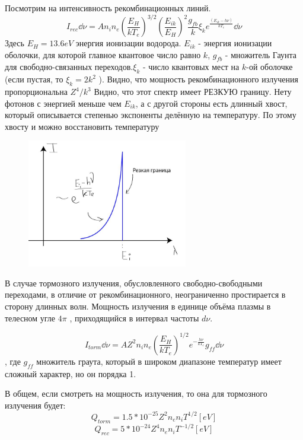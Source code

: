 \documentclass[10pt, a4paper]{article}
\begin{document}
Посмотрим на интенсивность рекомбинационных линий.
\begin{equation}
	I_{rec} \dd\nu = A n_i n_e (\frac{E_H}{kT_e})^{3/2} (\frac{E_{ik}}{E_H})^{2} \frac{g_{fb}}{k} \xi_k e^{\frac{(E_{ik}-h \nu)}{kT_e}} \dd\nu 
\end{equation}
Здесь $E_H = 13.6 eV$ энергия ионизации водорода. $E_{ik}$ - энергия ионизации оболочки, для которой главное квантовое число равно $k$, $g_{fb}$ - множитель Гаунта для свободно-связанных переходов.$ \xi_k$ - число квантовых мест на $k$-ой оболочке (если пустая, то $ \xi_k = 2k^{2}$ ). 
Видно, что мощность рекомбинационного излучения пропорциональна $Z^{4}/k^3$
Видно, что этот спектр имеет РЕЗКУЮ границу. Нету фотонов с энергией меньше чем $E_{ik}$, а с другой стороны есть длинный хвост, который описывается степенью экспоненты делённую на температуру. По этому хвосту и можно восстановить температуру

\begin{figure}[ht]
	\begin{center}
		\includegraphics[width=70mm]{Intencity_recomb.JPG}
	\end{center}
\end{figure}

В случае тормозного излучения, обусловленного свободно-свободными переходами, в отличие от рекомбинационного, неограниченно простирается в сторону длинных волн. Мощность излучения в единице объёма плазмы в телесном угле $4 \pi$ , приходящийся в интервал частоты $d\nu$.

\begin{equation}
	I_{torm} \dd\nu = A Z^{2} n_i n_e (\frac{E_H}{kT_e})^{1/2} e^{-\frac{h \nu}{kT_e}} g_{ff} \dd\nu
\end{equation}
, где $g_{ff}$ множитель граута, который в широком диапазоне температур имеет сложный характер, но он порядка 1.

В общем, если смотреть на мощность излучения, то она для тормозного излучения будет:
\begin{equation}
	Q_{torm}=1.5 *10^{-25} Z^{2} n_e n_i T^{1/2}[eV]
\end{equation}
\begin{equation}
	Q_{rec}=5 *10^{-24} Z^{4} n_e n_i T^{-1/2}[eV]
\end{equation}
\end{document}
